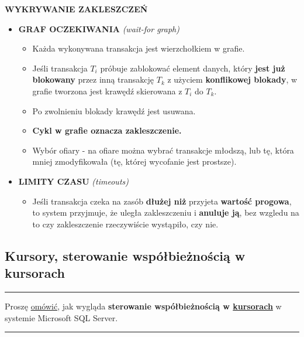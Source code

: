 \documentclass[a5paper,6pt]{article}
\newcommand{\horrule}[1]{\rule{\linewidth}{#1}}
\begin{document}
    \textbf{WYKRYWANIE ZAKLESZCZEŃ}
    \begin{itemize}
        \item \textbf{GRAF OCZEKIWANIA} \textit{(wait-for graph)}
        \begin{itemize}
            \item Każda wykonywana transakcja jest wierzchołkiem w grafie.
            \item Jeśli transakcja $T_i$ próbuje zablokować element danych,
                  który \textbf{jest już blokowany} przez inną transakcję $T_k$
                  z użyciem \textbf{konflikowej blokady}, w grafie tworzona
                  jest krawędź skierowana z $T_i$ do $T_k$.
            \item Po zwolnieniu blokady krawędź jest usuwana.
            \item \textbf{Cykl w grafie oznacza zakleszczenie.}
            \item Wybór ofiary - na ofiare można wybrać transakcje młodszą, lub
                  tę, która mniej zmodyfikowała (tę, której wycofanie jest
                  prostsze).
        \end{itemize}

        \item \textbf{LIMITY CZASU} \textit{(timeouts)}
        \begin{itemize}
            \item Jeśli transakcja czeka na zasób \textbf{dłużej niż}
                  przyjeta \textbf{wartość progowa}, to system przyjmuje, że
                  uległa zakleszczeniu i \textbf{anuluje ją}, bez wzgledu na to
                  czy zakleszczenie rzeczywiście wystąpiło, czy nie.
        \end{itemize}
    \end{itemize}

\pagebreak

    \subsection{Kursory, sterowanie współbieżnością w kursorach} %
    \label{sub:kursory_sterowanie_wspolbieznoscia_w_kursorach}

    \horrule{0.5pt}
    Proszę \underline{omówić}, jak wygląda \textbf{sterowanie współbieżnością w
    \underline{kursorach}} w systemie Microsoft SQL Server.\\
    \horrule{0.5pt}
\end{document}
